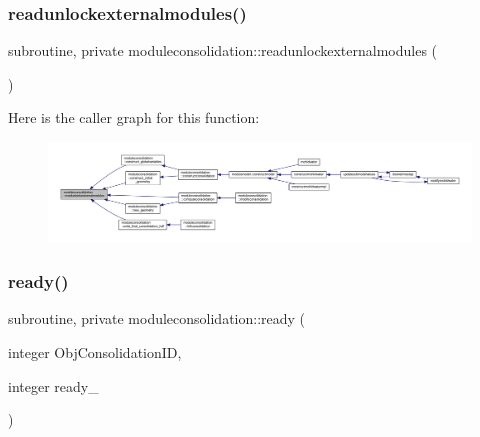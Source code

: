 \subsubsection{\texorpdfstring{readunlockexternalmodules()}{readunlockexternalmodules()}}
{\footnotesize\ttfamily subroutine, private moduleconsolidation\+::readunlockexternalmodules (\begin{DoxyParamCaption}{ }\end{DoxyParamCaption})\hspace{0.3cm}{\ttfamily [private]}}

Here is the caller graph for this function\+:\nopagebreak
\begin{figure}[H]
\begin{center}
\leavevmode
\includegraphics[width=350pt]{namespacemoduleconsolidation_a146c8502b0f191abd1664acdcd22a4c4_icgraph}
\end{center}
\end{figure}
\mbox{\label{namespacemoduleconsolidation_ab6b8d86bedc5c2870f1fb998c297005e}} 
\subsubsection{\texorpdfstring{ready()}{ready()}}
{\footnotesize\ttfamily subroutine, private moduleconsolidation\+::ready (\begin{DoxyParamCaption}\item[{integer}]{Obj\+Consolidation\+ID,  }\item[{integer}]{ready\+\_\+ }\end{DoxyParamCaption})\hspace{0.3cm}{\ttfamily [private]}}

